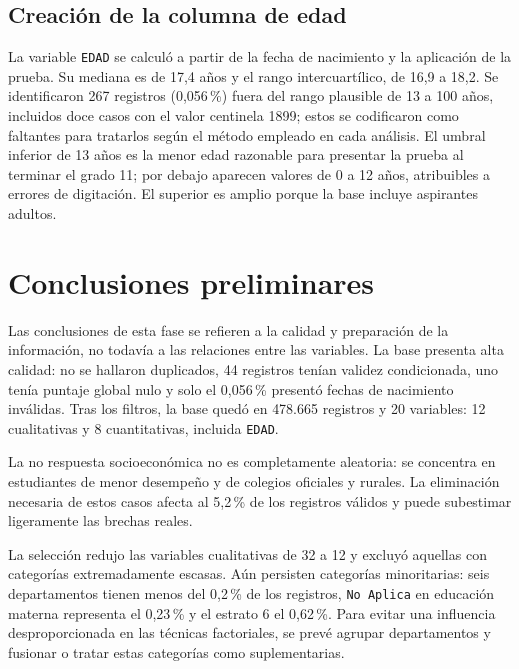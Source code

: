 \documentclass[12pt]{article}
\newcommand{\corr}[1]{\textcolor{azulcorr}{#1}}
\newenvironment{correccion}{\par\color{azulcorr}}{\par}
\begin{document}
\subsection{Creación de la columna de edad}
La variable \texttt{EDAD} se calculó a partir de la fecha de nacimiento y la aplicación
de la prueba. Su mediana es de 17,4 años y el rango intercuartílico, de 16,9 a 18,2.
Se identificaron \corr{267 registros (0,056\,\%)} fuera del rango plausible de \corr{13} a
100 años, incluidos \corr{doce} casos con el valor centinela 1899; estos se codificaron
como faltantes para tratarlos según el método empleado en cada análisis. \corr{El umbral
inferior de 13 años es la menor edad razonable para presentar la prueba al terminar el
grado 11; por debajo aparecen valores de 0 a 12 años, atribuibles a errores de digitación.
El superior es amplio porque la base incluye aspirantes adultos.}

\section{Conclusiones preliminares}

Las conclusiones de esta fase se refieren a la calidad y preparación de la información,
no todavía a las relaciones entre las variables. La base presenta alta calidad: no se
hallaron duplicados, 44 registros tenían validez condicionada, uno tenía puntaje global
nulo y solo el \corr{0,056\,\%} presentó fechas de nacimiento inválidas. Tras los filtros,
la base quedó en \corr{478.665 registros y 20 variables: 12 cualitativas y 8 cuantitativas,
incluida \texttt{EDAD}}.

La no respuesta socioeconómica no es completamente aleatoria: se concentra en estudiantes
de menor desempeño y de colegios oficiales y rurales. La eliminación necesaria de estos
casos afecta al \corr{5,2\,\%} de los registros válidos y puede subestimar ligeramente las
brechas reales.

\begin{correccion}
La selección redujo las variables cualitativas de 32 a 12 y excluyó aquellas con categorías
extremadamente escasas. Aún persisten categorías minoritarias: seis departamentos tienen
menos del 0,2\,\% de los registros, \texttt{No Aplica} en educación materna representa el
0,23\,\% y el estrato 6 el 0,62\,\%. Para evitar una influencia desproporcionada en las
técnicas factoriales, se prevé agrupar departamentos y fusionar o tratar estas categorías
como suplementarias.
\end{correccion}
\end{document}
